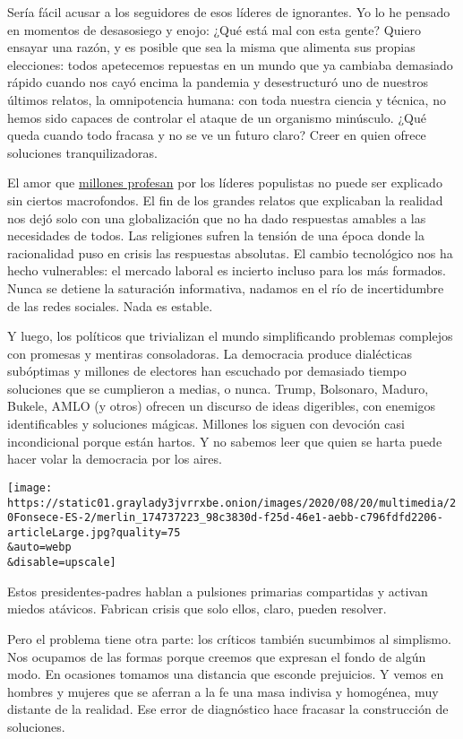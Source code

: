 Sería fácil acusar a los seguidores de esos líderes de ignorantes. Yo lo
he pensado en momentos de desasosiego y enojo: ¿Qué está mal con esta
gente? Quiero ensayar una razón, y es posible que sea la misma que
alimenta sus propias elecciones: todos apetecemos repuestas en un mundo
que ya cambiaba demasiado rápido cuando nos cayó encima la pandemia y
desestructuró uno de nuestros últimos relatos, la omnipotencia humana:
con toda nuestra ciencia y técnica, no hemos sido capaces de controlar
el ataque de un organismo minúsculo. ¿Qué queda cuando todo fracasa y no
se ve un futuro claro? Creer en quien ofrece soluciones
tranquilizadoras.

El amor que
\href{https://www.plazapublica.com.gt/content/el-asalto-de-los-outsiders}{millones
profesan} por los líderes populistas no puede ser explicado sin ciertos
macrofondos. El fin de los grandes relatos que explicaban la realidad
nos dejó solo con una globalización que no ha dado respuestas amables a
las necesidades de todos. Las religiones sufren la tensión de una época
donde la racionalidad puso en crisis las respuestas absolutas. El cambio
tecnológico nos ha hecho vulnerables: el mercado laboral es incierto
incluso para los más formados. Nunca se detiene la saturación
informativa, nadamos en el río de incertidumbre de las redes sociales.
Nada es estable.

Y luego, los políticos que trivializan el mundo simplificando problemas
complejos con promesas y mentiras consoladoras. La democracia produce
dialécticas subóptimas y millones de electores han escuchado por
demasiado tiempo soluciones que se cumplieron a medias, o nunca. Trump,
Bolsonaro, Maduro, Bukele, AMLO (y otros) ofrecen un discurso de ideas
digeribles, con enemigos identificables y soluciones mágicas. Millones
los siguen con devoción casi incondicional porque están hartos. Y no
sabemos leer que quien se harta puede hacer volar la democracia por los
aires.

\texttt{[image: https://static01.graylady3jvrrxbe.onion/images/2020/08/20/multimedia/20Fonsece-ES-2/merlin\_174737223\_98c3830d-f25d-46e1-aebb-c796fdfd2206-articleLarge.jpg?quality=75\\\&auto=webp\\\&disable=upscale]}

Estos presidentes-padres hablan a pulsiones primarias compartidas y
activan miedos atávicos. Fabrican crisis que solo ellos, claro, pueden
resolver.

Pero el problema tiene otra parte: los críticos también sucumbimos al
simplismo. Nos ocupamos de las formas porque creemos que expresan el
fondo de algún modo. En ocasiones tomamos una distancia que esconde
prejuicios. Y vemos en hombres y mujeres que se aferran a la fe una masa
indivisa y homogénea, muy distante de la realidad. Ese error de
diagnóstico hace fracasar la construcción de soluciones.

